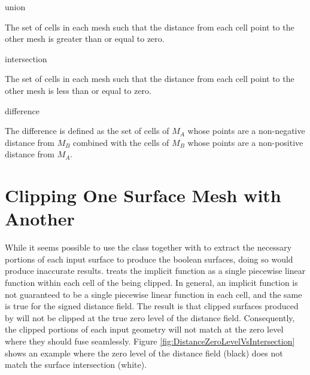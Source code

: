 \documentclass{InsightArticle}
\begin{document}
\begin{description}

\item union

The set of cells in each mesh such that the distance from each cell point to the other mesh is greater than or equal to zero.

\item intersection

The set of cells in each mesh such that the distance from each cell point to the other mesh is less than or equal to zero.

\item difference

The difference is defined as the set of cells of $M_A$ whose points are a non-negative distance from $M_B$ combined with the cells of $M_B$ whose points are a non-positive distance from $M_A$.

\end{description}

\section{Clipping One Surface Mesh with Another}

While it seems possible to use the class  together with  to extract the necessary portions of each input surface to produce the boolean surfaces, doing so would produce inaccurate results.  treats the implicit function as a single piecewise linear function within each cell of the  being clipped. In general, an implicit function is not guaranteed to be a single piecewise linear function in each cell, and the same is true for the signed distance field. The result is that clipped surfaces produced by  will not be clipped at the true zero level of the distance field. Consequently, the clipped portions of each input geometry will not match at the zero level where they should fuse seamlessly. Figure \ref{fig:DistanceZeroLevelVsIntersection} shows an example where the zero level of the distance field (black) does not match the surface intersection (white). 
\end{document}
